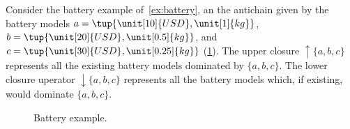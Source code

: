 \begin{example}
Consider the battery example of~\cref{ex:battery}, an the antichain given by the battery models $a=\tup{\unit[10]{USD},\unit[1]{kg}}$, $b=\tup{\unit[20]{USD},\unit[0.5]{kg}}$, and $c=\tup{\unit[30]{USD},\unit[0.25]{kg}}$ (\cref{fig:examplebatt}).
The upper closure $\uparrow \{a,b,c\}$ represents all the existing battery models dominated by $\{a,b,c\}$. The lower closure uperator $\downarrow\{a,b,c\}$ represents all the battery models which, if existing, would dominate $\{a,b,c\}$.
\begin{figure}[h!]
\begin{center}
\end{center}
\caption{Battery example. \label{fig:examplebatt}}
\end{figure}
\end{example}


